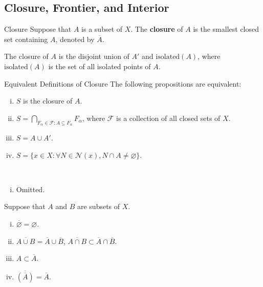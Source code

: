 \documentclass{report}
\begin{document}
\subsection{Closure, Frontier, and Interior}

\begin{definition}{Closure}{}
	Suppose that $A$ is a subset of $X$. The \textbf{closure} of $A$ is the smallest closed set containing $A$, denoted by $\overline{A}$.
\end{definition}

The closure of $A$ is the disjoint union of $A'$ and $\mathrm{isolated}(A)$, where $\mathrm{isolated}(A)$ is the set of all isolated points of $A$.

\begin{proposition}{Equivalent Definitions of Closure}{}
	The following propositions are equivalent:
	\begin{enumerate}[(i)]
		\item $S$ is the closure of $A$.
		\item $S=\bigcap\limits_{F_\alpha\in\mathcal{F}:A\subseteq F_\alpha}F_\alpha$, where $\mathcal{F}$ is a collection of all closed sets of $X$.
		\item $S=A\cup A'$.
		\item $S=\{x\in X: \forall N\in\mathcal{N}(x),N\cap A\ne\varnothing\}$.
	\end{enumerate}
\end{proposition}


\begin{prf}~\\ \vspace{-1em}
	\begin{enumerate}[(i)]
		\item Omitted.
	\end{enumerate}
\end{prf}

\begin{proposition}{}{}
	Suppose that $A$ and $B$ are subsets of $X$.
	\begin{enumerate}[(i)]
		\item $\overline{\varnothing}=\varnothing$.
		\item $\overline{A \cup B}=\overline{A}\cup\overline{B}$,  $\overline{A \cap B}\subset\overline{A}\cap\overline{B}$.
		\item $A\subset\overline{A}$.
		\item $\overline{\left(\overline{A}\right)}=\overline{A}$.
	\end{enumerate}
\end{proposition}
\end{document}
